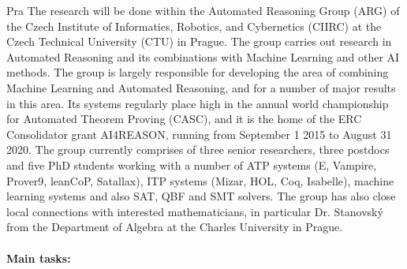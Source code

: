 \begin{sitedescription}{Pra}
The research will be done within the
Automated Reasoning
Group
(ARG) of the 
Czech Institute of Informatics, Robotics, and Cybernetics (CIIRC)
at the Czech Technical University (CTU) in Prague. The group carries
out research in Automated Reasoning and its combinations with Machine
Learning and other AI methods. The group is largely responsible for
developing the area of combining Machine Learning and Automated
Reasoning, and for a number of major results in this area.  Its systems
regularly place high in the annual world championship for Automated
Theorem Proving (CASC), and it is the home of the ERC Consolidator
grant AI4REASON, running from September 1 2015 to August 31 2020. The
group currently comprises of three senior researchers, three postdocs
and five PhD students working with a number of ATP systems (E,
Vampire, Prover9, leanCoP, Satallax), ITP systems (Mizar, HOL, Coq,
Isabelle), machine learning systems and also SAT, QBF and SMT
solvers. The group has also close local connections with interested
mathematicians, in particular Dr. Stanovsk\'y from the Department of
Algebra at the Charles University in Prague. 



\paragraph*{Main tasks:}


\end{sitedescription}
